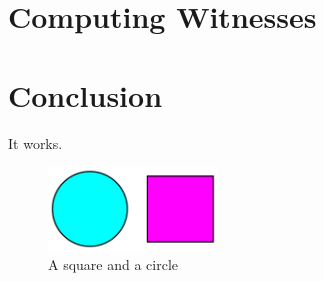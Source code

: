

\section{Computing Witnesses} %




\section{Conclusion} %

It works.

\begin{figure}
  \centering
  \includegraphics[width=0.4\textwidth]{fig/square-circle}
  \caption{A square and a circle}
  \label{fig:square-circle}
\end{figure} 


%
%
%
%
%
%

%



